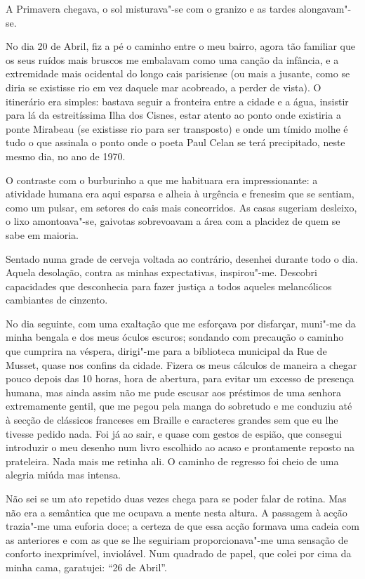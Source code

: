 A Primavera chegava, o sol misturava"-se com o granizo e as tardes
alongavam"-se.

No dia 20 de Abril, fiz a pé o caminho entre o meu bairro, agora tão
familiar que os seus ruídos mais bruscos me embalavam como uma canção
da infância, e a extremidade mais ocidental do longo cais parisiense (ou
mais a jusante, como se diria se existisse rio em vez daquele mar
acobreado, a perder de vista). O itinerário era simples: bastava seguir
a fronteira entre a cidade e a água, insistir para lá da estreitíssima
Ilha dos Cisnes, estar atento ao ponto onde existiria a ponte Mirabeau
(se existisse rio para ser transposto) e onde um tímido molhe é tudo o
que assinala o ponto onde o poeta Paul Celan se terá precipitado, neste
mesmo dia, no ano de 1970.

O contraste com o burburinho a que me habituara era
impressionante: a atividade humana era aqui esparsa e alheia à urgência
e frenesim que se sentiam, como um pulsar, em setores do cais mais
concorridos. As casas sugeriam desleixo, o lixo amontoava"-se, gaivotas
sobrevoavam a área com a placidez de quem se sabe em maioria.

Sentado numa grade de cerveja voltada ao contrário, desenhei durante
todo o dia. Aquela desolação, contra as minhas expectativas,
inspirou"-me. Descobri capacidades que desconhecia para fazer justiça a
todos aqueles melancólicos cambiantes de cinzento.

No dia seguinte, com uma exaltação que me esforçava por disfarçar,
muni"-me da minha bengala e dos meus óculos escuros; sondando com
precaução o caminho que cumprira na véspera, dirigi"-me para a biblioteca
municipal da Rue de Musset, quase nos confins da cidade. Fizera os meus
cálculos de maneira a chegar pouco depois das 10 horas, hora de abertura, para evitar um excesso de presença humana, mas ainda assim não me
pude escusar aos préstimos de uma senhora extremamente gentil, que me
pegou pela manga do sobretudo e me conduziu até à secção de clássicos
franceses em Braille e caracteres grandes sem que eu lhe tivesse pedido
nada. Foi já ao sair, e quase com gestos de espião, que consegui
introduzir o meu desenho num livro escolhido ao acaso e prontamente
reposto na prateleira. Nada mais me retinha ali. O caminho de regresso
foi cheio de uma alegria miúda mas intensa.

Não sei se um ato repetido duas vezes chega para se poder falar de
rotina. Mas não era a semântica que me ocupava a mente nesta altura. A
passagem à acção trazia"-me uma euforia doce; a certeza de que essa acção
formava uma cadeia com as anteriores e com as que se lhe seguiriam
proporcionava"-me uma sensação de conforto inexprimível, inviolável. Num
quadrado de papel, que colei por cima da minha cama, garatujei: ``26
de Abril''.

